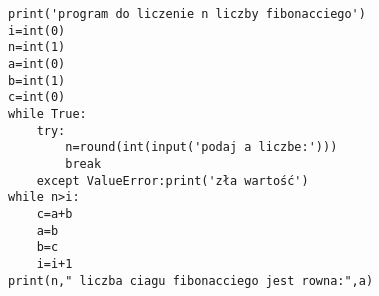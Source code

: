 \begin{verbatim}
print('program do liczenie n liczby fibonacciego')
i=int(0)
n=int(1)
a=int(0)
b=int(1)
c=int(0)
while True:
    try:
        n=round(int(input('podaj a liczbe:')))
        break   
    except ValueError:print('zła wartość')
while n>i:
    c=a+b
    a=b
    b=c
    i=i+1
print(n," liczba ciagu fibonacciego jest rowna:",a)
\end{verbatim}